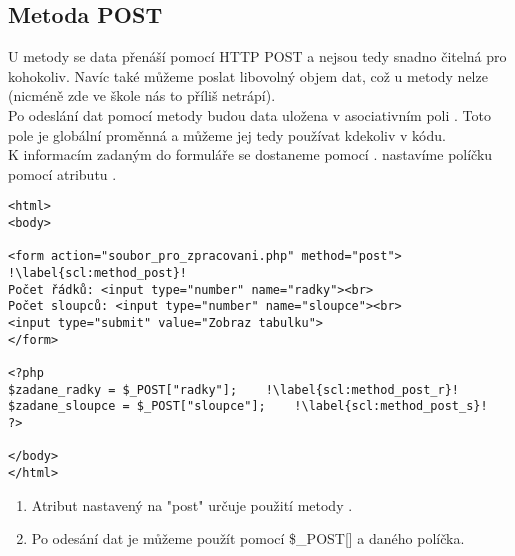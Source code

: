 \subsection{Metoda POST} 
U metody  se data přenáší pomocí HTTP POST a nejsou tedy snadno čitelná pro kohokoliv. Navíc také můžeme poslat libovolný objem dat, což u metody  nelze (nicméně zde ve škole nás to příliš netrápí).\\
Po odeslání dat pomocí metody  budou data uložena v asociativním poli . Toto pole je globální proměnná a můžeme jej tedy používat kdekoliv v kódu.\\
K informacím zadaným do formuláře se dostaneme pomocí  .  nastavíme políčku pomocí atributu . \\

\begin{minipage}[t]{.45\textwidth}
\begin{code}
\begin{verbatim}
<html>
<body>

<form action="soubor_pro_zpracovani.php" method="post"> !\label{scl:method_post}!
Počet řádků: <input type="number" name="radky"><br>
Počet sloupců: <input type="number" name="sloupce"><br>
<input type="submit" value="Zobraz tabulku">
</form>

<?php
$zadane_radky = $_POST["radky"];	!\label{scl:method_post_r}!
$zadane_sloupce = $_POST["sloupce"];	!\label{scl:method_post_s}!
?>

</body>
</html> 
\end{verbatim}

\label{code:php_form_post}
\end{code}
\end{minipage}
\begin{minipage}[t]{.45\textwidth}
\vspace{2.7cm}
\begin{enumerate}
\item[ř. \ref{scl:method_post}:] Atribut  nastavený na "post" určuje použití metody .
\item[ř. \ref{scl:method_post_r}, \ref{scl:method_post_s}:] Po odesání dat je můžeme použít pomocí \$\_POST[] a  daného políčka.
\end{enumerate}
\end{minipage}




